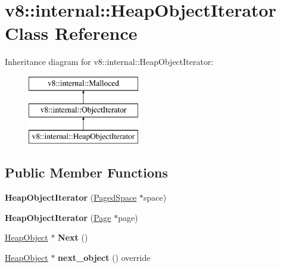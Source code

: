 \hypertarget{classv8_1_1internal_1_1_heap_object_iterator}{}\section{v8\+:\+:internal\+:\+:Heap\+Object\+Iterator Class Reference}
\label{classv8_1_1internal_1_1_heap_object_iterator}
Inheritance diagram for v8\+:\+:internal\+:\+:Heap\+Object\+Iterator\+:\begin{figure}[H]
\begin{center}
\leavevmode
\includegraphics[height=3.000000cm]{classv8_1_1internal_1_1_heap_object_iterator}
\end{center}
\end{figure}
\subsection*{Public Member Functions}
\begin{DoxyCompactItemize}
\item 
{\bfseries Heap\+Object\+Iterator} (\hyperlink{classv8_1_1internal_1_1_paged_space}{Paged\+Space} $\ast$space)\hypertarget{classv8_1_1internal_1_1_heap_object_iterator_acafe719dc17a39eeb032d27a928c81c1}{}\label{classv8_1_1internal_1_1_heap_object_iterator_acafe719dc17a39eeb032d27a928c81c1}

\item 
{\bfseries Heap\+Object\+Iterator} (\hyperlink{classv8_1_1internal_1_1_page}{Page} $\ast$page)\hypertarget{classv8_1_1internal_1_1_heap_object_iterator_a69c2d09f4c5b7a0fdccd4b99f4272d79}{}\label{classv8_1_1internal_1_1_heap_object_iterator_a69c2d09f4c5b7a0fdccd4b99f4272d79}

\item 
\hyperlink{classv8_1_1internal_1_1_heap_object}{Heap\+Object} $\ast$ {\bfseries Next} ()\hypertarget{classv8_1_1internal_1_1_heap_object_iterator_a8178e60a9f014fd761b574f4ffa29e56}{}\label{classv8_1_1internal_1_1_heap_object_iterator_a8178e60a9f014fd761b574f4ffa29e56}

\item 
\hyperlink{classv8_1_1internal_1_1_heap_object}{Heap\+Object} $\ast$ {\bfseries next\+\_\+object} () override\hypertarget{classv8_1_1internal_1_1_heap_object_iterator_a117c6442dd662e449280bee29ebee27d}{}\label{classv8_1_1internal_1_1_heap_object_iterator_a117c6442dd662e449280bee29ebee27d}

\end{DoxyCompactItemize}
